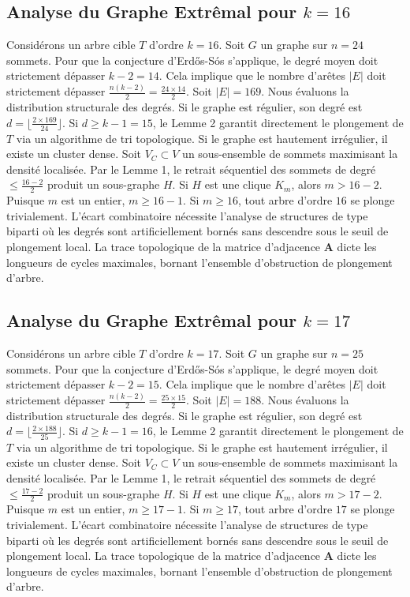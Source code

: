 \documentclass[11pt,a4paper]{article}
\begin{document}
\subsection{Analyse du Graphe Extr\^emal pour $k=16$}
Consid\'erons un arbre cible $T$ d'ordre $k=16$.
Soit $G$ un graphe sur $n=24$ sommets.
Pour que la conjecture d'Erd\H{o}s-S\'os s'applique, le degr\'e moyen doit strictement d\'epasser $k-2 = 14$.
Cela implique que le nombre d'ar\^etes $|E|$ doit strictement d\'epasser $\frac{n(k-2)}{2} = \frac{24 \times 14}{2}$.
Soit $|E| = 169$.
Nous \'evaluons la distribution structurale des degr\'es. Si le graphe est r\'egulier, son degr\'e est $d = \lfloor \frac{2 \times 169}{24} \rfloor$.
Si $d \geq k-1 = 15$, le Lemme 2 garantit directement le plongement de $T$ via un algorithme de tri topologique.
Si le graphe est hautement irr\'egulier, il existe un cluster dense. Soit $V_C \subset V$ un sous-ensemble de sommets maximisant la densit\'e localis\'ee.
Par le Lemme 1, le retrait s\'equentiel des sommets de degr\'e $\leq \frac{16-2}{2}$ produit un sous-graphe $H$.
Si $H$ est une clique $K_{m}$, alors $m > 16-2$. Puisque $m$ est un entier, $m \geq 16-1$. Si $m \geq 16$, tout arbre d'ordre $16$ se plonge trivialement.
L'\'ecart combinatoire n\'ecessite l'analyse de structures de type biparti o\`u les degr\'es sont artificiellement born\'es sans descendre sous le seuil de plongement local. La trace topologique de la matrice d'adjacence $\mathbf{A}$ dicte les longueurs de cycles maximales, bornant l'ensemble d'obstruction de plongement d'arbre.


\subsection{Analyse du Graphe Extr\^emal pour $k=17$}
Consid\'erons un arbre cible $T$ d'ordre $k=17$.
Soit $G$ un graphe sur $n=25$ sommets.
Pour que la conjecture d'Erd\H{o}s-S\'os s'applique, le degr\'e moyen doit strictement d\'epasser $k-2 = 15$.
Cela implique que le nombre d'ar\^etes $|E|$ doit strictement d\'epasser $\frac{n(k-2)}{2} = \frac{25 \times 15}{2}$.
Soit $|E| = 188$.
Nous \'evaluons la distribution structurale des degr\'es. Si le graphe est r\'egulier, son degr\'e est $d = \lfloor \frac{2 \times 188}{25} \rfloor$.
Si $d \geq k-1 = 16$, le Lemme 2 garantit directement le plongement de $T$ via un algorithme de tri topologique.
Si le graphe est hautement irr\'egulier, il existe un cluster dense. Soit $V_C \subset V$ un sous-ensemble de sommets maximisant la densit\'e localis\'ee.
Par le Lemme 1, le retrait s\'equentiel des sommets de degr\'e $\leq \frac{17-2}{2}$ produit un sous-graphe $H$.
Si $H$ est une clique $K_{m}$, alors $m > 17-2$. Puisque $m$ est un entier, $m \geq 17-1$. Si $m \geq 17$, tout arbre d'ordre $17$ se plonge trivialement.
L'\'ecart combinatoire n\'ecessite l'analyse de structures de type biparti o\`u les degr\'es sont artificiellement born\'es sans descendre sous le seuil de plongement local. La trace topologique de la matrice d'adjacence $\mathbf{A}$ dicte les longueurs de cycles maximales, bornant l'ensemble d'obstruction de plongement d'arbre.
\end{document}
